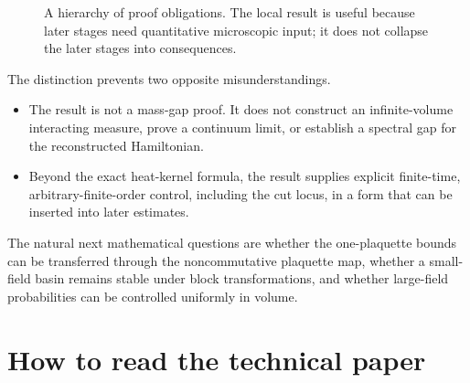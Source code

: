 \documentclass[11pt]{article}
\theoremstyle{definition}
\begin{document}
\begin{figure}[ht]
\centering
{}
\caption{A hierarchy of proof obligations.  The local result is useful because
later stages need quantitative microscopic input; it does not collapse the
later stages into consequences.}
\label{expl:fig:programme}
\end{figure}

The distinction prevents two opposite misunderstandings.
\begin{itemize}
\item The result is not a mass-gap proof.  It does not construct an
infinite-volume interacting measure, prove a continuum limit, or establish a
spectral gap for the reconstructed Hamiltonian.
\item Beyond the exact heat-kernel formula, the result supplies explicit
finite-time, arbitrary-finite-order control, including the cut locus, in a
form that can be inserted into later estimates.
\end{itemize}

The natural next mathematical questions are whether the one-plaquette bounds
can be transferred through the noncommutative plaquette map, whether a
small-field basin remains stable under block transformations, and whether
large-field probabilities can be controlled uniformly in volume.

\section{How to read the technical paper}
\end{document}
